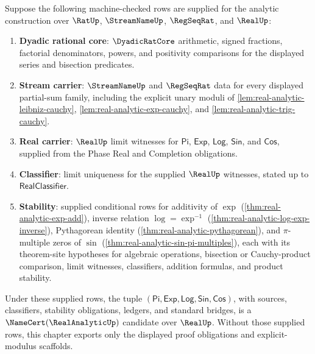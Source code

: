 \begin{theorem}
\label{thm:real-analytic-certificate-boundary}
Suppose the following machine-checked rows are supplied for the analytic construction over $\RatUp$, $\StreamNameUp$, $\RegSeqRat$, and $\RealUp$:
\begin{enumerate}
  \item \textbf{Dyadic rational core}: $\DyadicRatCore$ arithmetic, signed fractions, factorial denominators, powers, and positivity comparisons for the displayed series and bisection predicates.
  \item \textbf{Stream carrier}: $\StreamNameUp$ and $\RegSeqRat$ data for every displayed partial-sum family, including the explicit unary moduli of \autoref{lem:real-analytic-leibniz-cauchy}, \autoref{lem:real-analytic-exp-cauchy}, and \autoref{lem:real-analytic-trig-cauchy}.
  \item \textbf{Real carrier}: $\RealUp$ limit witnesses for $\mathsf{Pi}$, $\mathsf{Exp}$, $\mathsf{Log}$, $\mathsf{Sin}$, and $\mathsf{Cos}$, supplied from the Phase Real and Completion obligations.
  \item \textbf{Classifier}: limit uniqueness for the supplied $\RealUp$ witnesses, stated up to $\mathsf{RealClassifier}$.
  \item \textbf{Stability}: supplied conditional rows for additivity of $\exp$ (\autoref{thm:real-analytic-exp-add}), inverse relation $\log = \exp^{-1}$ (\autoref{thm:real-analytic-log-exp-inverse}), Pythagorean identity (\autoref{thm:real-analytic-pythagorean}), and $\pi$-multiple zeros of $\sin$ (\autoref{thm:real-analytic-sin-pi-multiples}), each with its theorem-site hypotheses for algebraic operations, bisection or Cauchy-product comparison, limit witnesses, classifiers, addition formulas, and product stability.
\end{enumerate}
Under these supplied rows, the tuple $(\mathsf{Pi}, \mathsf{Exp}, \mathsf{Log}, \mathsf{Sin}, \mathsf{Cos})$, with sources, classifiers, stability obligations, ledgers, and standard bridges, is a $\NameCert(\RealAnalyticUp)$ candidate over $\RealUp$. Without those supplied rows, this chapter exports only the displayed proof obligations and explicit-modulus scaffolds.
\end{theorem}
